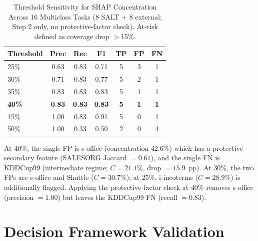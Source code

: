 \documentclass{uai2026} %
\begin{document}
\begin{table}[htbp]
\centering
\caption{Threshold Sensitivity for SHAP Concentration Across 16 Multiclass Tasks (8 SALT + 8 external; Step 2 only, no protective-factor check). At-risk defined as coverage drop $>$15\%.}\label{tab:threshold_sensitivity}
\small
\begin{tabular}{lcccccc}
\toprule
Threshold & Prec & Rec & F1 & TP & FP & FN \\
\midrule
25\% & 0.63 & 0.83 & 0.71 & 5 & 3 & 1 \\
30\% & 0.71 & 0.83 & 0.77 & 5 & 2 & 1 \\
35\% & 0.83 & 0.83 & 0.83 & 5 & 1 & 1 \\
\textbf{40\%} & \textbf{0.83} & \textbf{0.83} & \textbf{0.83} & \textbf{5} & \textbf{1} & \textbf{1} \\
45\% & 1.00 & 0.83 & 0.91 & 5 & 0 & 1 \\
50\% & 1.00 & 0.33 & 0.50 & 2 & 0 & 4 \\
\bottomrule
\end{tabular}


\raggedright
\footnotesize
At 40\%, the single FP is s-office (concentration 42.6\%) which has a protective secondary feature (SALESORG Jaccard $= 0.61$), and the single FN is KDDCup99 (intermediate regime; $C=21.1\%$, drop $=15.9$~pp). At 30\%, the two FPs are s-office and Shuttle ($C=30.7\%$); at 25\%, i-incoterms ($C=28.9\%$) is additionally flagged. Applying the protective-factor check at 40\% removes s-office (precision $= 1.00$) but leaves the KDDCup99 FN (recall $= 0.83$).
\end{table}

\section{Decision Framework Validation}\label{app:framework}
\end{document}
